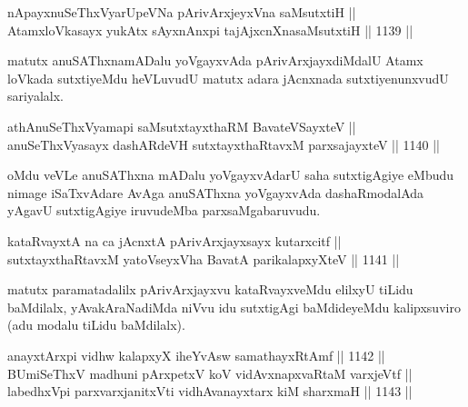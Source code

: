 \begin{shl}
nApayxnuSeThxVyarUpeVNa pArivArxjeyxVna saMsutxtiH || \\
AtamxloVkasayx yukAtx sAyxnAnxpi tajAjxcnXnasaMsutxtiH ||  1139 ||  
\end{shl}

\begin{artha}
matutx anuSAThxnamADalu yoVgayxvAda pArivArxjayxdiMdalU Atamx loVkada sutxtiyeMdu heVLuvudU matutx adara jAcnxnada sutxtiyenunxvudU sariyalalx.
\end{artha}

\begin{shl}
athAnuSeThxVyamapi saMsutxtayxthaRM BavateVSayxteV || \\
anuSeThxVyasayx dashARdeVH sutxtayxthaRtavxM parxsajayxteV ||  1140 ||  
\end{shl}

\begin{artha}
oMdu veVLe anuSAThxna mADalu yoVgayxvAdarU saha sutxtigAgiye eMbudu nimage iSaTxvAdare AvAga anuSAThxna yoVgayxvAda dashaRmodalAda yAgavU sutxtigAgiye iruvudeMba parxsaMgabaruvudu.
\end{artha}

\begin{shl}
\footnotemark[1]kataRvayxtA na ca jAcnxtA pArivArxjayxsayx kutarxcitf ||  \\
sutxtayxthaRtavxM yatoV\s seyxVha BavatA parikalapxyXteV ||  1141 ||  
\end{shl}

\begin{artha}
matutx paramatadalilx pArivArxjayxvu kataRvayxveMdu elilxyU tiLidu baMdilalx, yAvakAraNadiMda niVvu idu sutxtigAgi baMdideyeMdu kalipxsuviro (adu modalu tiLidu baMdilalx).
\end{artha}

\begin{shl}
anayxtArxpi vidhw kalapxyX iheYvAsw samathayxRtAmf ||  1142 || \\
\footnotemark[1]BUmiSeThxV madhuni pArxpetxV koV vidAvxnapxvaRtaM varxjeVtf || \\
labedhxV\s pi parxvarxjanitxVti vidhAvanayxtarx kiM sharxmaH ||  1143 ||  
\end{shl}

